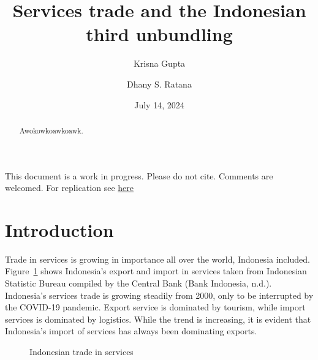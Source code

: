 \documentclass[
  a4paper,
  DIV=11,
  numbers=noendperiod]{scrreprt}
\title{Services trade and the Indonesian third unbundling}
\author{Krisna Gupta \and Dhany S. Ratana}
\date{July 14, 2024}
\begin{document}
\maketitle
\begin{abstract}
Awokowkoawkoawk.
\end{abstract}

\begin{tcolorbox}[enhanced jigsaw, colback=white, opacityback=0, bottomrule=.15mm, breakable, colbacktitle=quarto-callout-warning-color!10!white, colframe=quarto-callout-warning-color-frame, bottomtitle=1mm, rightrule=.15mm, coltitle=black, titlerule=0mm, arc=.35mm, toprule=.15mm, leftrule=.75mm, left=2mm, title=\textcolor{quarto-callout-warning-color}{\faExclamationTriangle}\hspace{0.5em}{Warning}, toptitle=1mm, opacitybacktitle=0.6]

This document is a work in progress. Please do not cite. Comments are
welcomed. For replication see
\href{https://github.com/imedkrisna/ERIA_services}{here}

\end{tcolorbox}

\section{Introduction}\label{introduction}

Trade in services is growing in importance all over the world, Indonesia
included. Figure~\ref{fig-1} shows Indonesia's export and import in
services taken from Indonesian Statistic Bureau compiled by the Central
Bank (Bank Indonesia, n.d.). Indonesia's services trade is growing
steadily from 2000, only to be interrupted by the COVID-19 pandemic.
Export service is dominated by tourism, while import services is
dominated by logistics. While the trend is increasing, it is evident
that Indonesia's import of services has always been dominating exports.

\begin{figure}


\caption{\label{fig-1}Indonesian trade in services}

\end{figure}%
\end{document}
